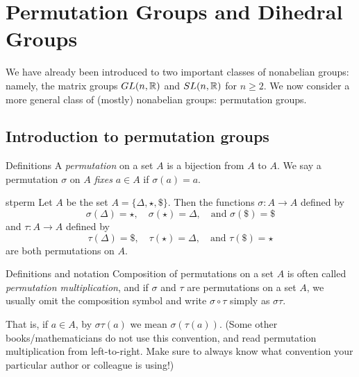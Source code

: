 \chapter{Permutation Groups and Dihedral Groups}\label{perm}%

We have already been introduced to two important classes of
nonabelian groups: namely, the matrix groups $GL(n,\mathbb{R})$ and
$SL(n,\mathbb{R})$ for $n\geq 2$. We now consider a more general class of
(mostly) nonabelian groups: permutation groups.

\section{Introduction to permutation groups}

\begin{df}{Definitions} A \textit{permutation} on a set $A$ is a bijection from $A$
to $A$. We say a permutation $\sigma$ on $A$ \textit{fixes} $a\in
A$ if $\sigma(a)=a$.\end{df}


\begin{example}{stperm} Let $A$ be the set $A=\{\Delta, \star, \$\}$.  Then the functions $\sigma : A\to A$ defined by $$\sigma(\Delta)=\star,
\quad \sigma(\star)=\Delta, \quad \mbox{and } \sigma(\$)=\$ $$
and $\tau : A\to A$ defined by $$\tau(\Delta)=\$, \quad
\tau(\star)=\Delta, \quad \mbox{and } \tau(\$)=\star $$ are
both permutations on $A$. \end{example}


\begin{df}{Definitions and notation} Composition of permutations on a set $A$ is often called
\textit{permutation multiplication}, and if $\sigma$ and $\tau$
are permutations on a set $A$, we usually omit the composition
symbol and write $\sigma \circ \tau$ simply as $\sigma \tau$.\end{df}



That is, if $a\in A$, by $\sigma \tau(a)$ we mean $\sigma(\tau(a))$. (Some other books/mathematicians do not use this convention, and read permutation multiplication from left-to-right.
Make sure to always know what convention your particular author or colleague is using!)


